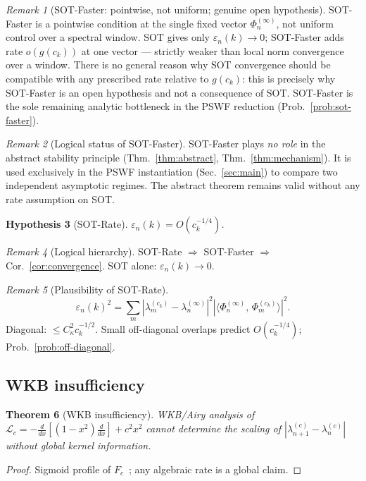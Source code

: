 \documentclass[12pt,a4paper]{amsart}
\newtheorem{theorem}{Theorem}[section]
\newtheorem{hypothesis}[theorem]{Hypothesis}
\theoremstyle{definition}
\theoremstyle{remark}
\newtheorem{remark}[theorem]{Remark}
\newcommand{\ip}[2]{\langle #1,\, #2\rangle}
\newcommand{\Lc}{\mathcal{L}_c}
\begin{document}
\begin{remark}[SOT-Faster: pointwise,
  not uniform; genuine open hypothesis]
\label{rem:sot-faster-localized}
SOT-Faster is a pointwise condition
at the single fixed vector
$\Phi_n^{(\infty)}$, not uniform control
over a spectral window.
SOT gives only $\varepsilon_n(k)\to 0$;
SOT-Faster adds rate $o(g(c_k))$
at one vector --- strictly weaker than
local norm convergence over a window.
There is no general reason why SOT
convergence should be compatible with
any prescribed rate relative to
$g(c_k)$: this is precisely why
SOT-Faster is an open hypothesis and
not a consequence of SOT.
SOT-Faster is the sole remaining
analytic bottleneck in the PSWF
reduction
(Prob.~\ref{prob:sot-faster}).
\end{remark}

\begin{remark}[Logical status of
  SOT-Faster]
\label{rem:sot-faster-logical}
SOT-Faster plays \emph{no role} in
the abstract stability principle
(Thm.~\ref{thm:abstract},
Thm.~\ref{thm:mechanism}).
It is used exclusively in the PSWF
instantiation (Sec.~\ref{sec:main})
to compare two independent asymptotic
regimes.
The abstract theorem remains valid
without any rate assumption on SOT.
\end{remark}

\begin{hypothesis}[SOT-Rate]
\label{hyp:sot-rate}
$\varepsilon_n(k) = O(c_k^{-1/4})$.
\end{hypothesis}

\begin{remark}[Logical hierarchy]
\label{rem:hyp-hierarchy}
SOT-Rate $\Rightarrow$ SOT-Faster
$\Rightarrow$
Cor.~\ref{cor:convergence}.
SOT alone: $\varepsilon_n(k)\to 0$.
\end{remark}

\begin{remark}[Plausibility of SOT-Rate]
\label{rem:sot-rate-plausible}
\begin{equation}\label{eq:formal-expansion}
  \varepsilon_n(k)^2
  = \sum_m
  |\lambda_m^{(c_k)}
  -\lambda_n^{(\infty)}|^2
  |\ip{\Phi_n^{(\infty)}}
  {\Phi_m^{(c_k)}}|^2.
\end{equation}
Diagonal: $\le C_\kappa^2 c_k^{-1/2}$.
Small off-diagonal overlaps predict
$O(c_k^{-1/4})$;
Prob.~\ref{prob:off-diagonal}.
\end{remark}

\subsection{WKB insufficiency}
\begin{theorem}[WKB insufficiency]
\label{thm:wkb-indeterminacy}
WKB/Airy analysis of
$\Lc=-\tfrac{d}{dx}[(1-x^2)
\tfrac{d}{dx}]+c^2x^2$
cannot determine the scaling of
$|\lambda_{n+1}^{(c)}
-\lambda_n^{(c)}|$
without global kernel information.
\end{theorem}
\begin{proof}
Sigmoid profile of
$F_c$~\cite{Widom1964};
any algebraic rate is a global claim.
\end{proof}
\end{document}
